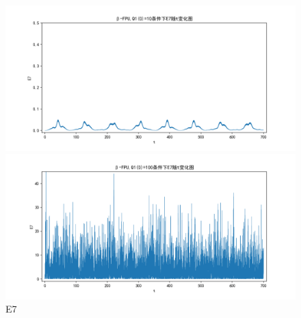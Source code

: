 \documentclass[10pt, a4paper]{article}
\begin{document}
    \begin{figure}[H]
        \begin{minipage}[t]{0.49\textwidth}
            \centering
            \includegraphics[width=\textwidth]{./q6_pics/cmp/E7.png}
        \end{minipage}
        \begin{minipage}[t]{0.49\textwidth}
            \centering
            \includegraphics[width=\textwidth]{./q6_pics/exp/E7.png}
        \end{minipage}
        \caption{E7}\label{fig:E7 in q6}
    \end{figure}
\end{document}

